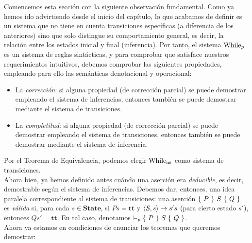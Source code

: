 Comencemos esta sección con la siguiente observación fundamental. Como ya hemos ido advirtiendo desde el inicio del capítulo, lo que acabamos de definir es un sistema que no tiene en cuenta transiciones específicas (a diferencia de los anteriores) sino que solo distingue su comportamiento general, es decir, la relación entre los estados inicial y final (inferencia). Por tanto, el sistema $\mathrm{While}_p$ es un sistema de reglas sintácticas, y para comprobar que satisface nuestros requerimientos intuitivos, debemos comprobar las siguientes propiedades, empleando para ello las semánticas denotacional y operacional:
\begin{itemize}
    \item La \textit{corrección}: si alguna propiedad (de corrección parcial) se puede demostrar empleando el sistema de inferencias, entonces también se puede demostrar mediante el sistema de transiciones.
    \item La \textit{completitud}: si alguna propiedad (de corrección parcial) se puede demostrar empleando el sistema de transiciones, entonces también se puede demostrar mediante el sistema de inferencia.
\end{itemize}
Por el Teorema de Equivalencia, podemos elegir $\mathrm{While}_{\mathrm{ns}}$ como sistema de transiciones. 
\\

Ahora bien, ya hemos definido antes cuándo una aserción era \textit{deducible}, es decir, demostrable según el sistema de inferencias. Debemos dar, entonces, una idea paralela correspondiente al sistema de transiciones: una aserción $\{\, \, P \, \, \}\, \, S\, \, \{ \, \, Q \, \, \}$ es \textit{válida} si, para cada $s\in \mathbf{State}$, si $Ps = \mathbf{tt}$ y $\langle S, s \rangle\to s's$ (para cierto estado $s'$), entonces $Qs' = \mathbf{tt}$. En tal caso, denotamos $\vDash_p \{\, \, P \, \, \}\, \, S\, \, \{ \, \, Q \, \, \}$.
\\

Ahora ya estamos en condiciones de enunciar los teoremas que queremos demostrar:

